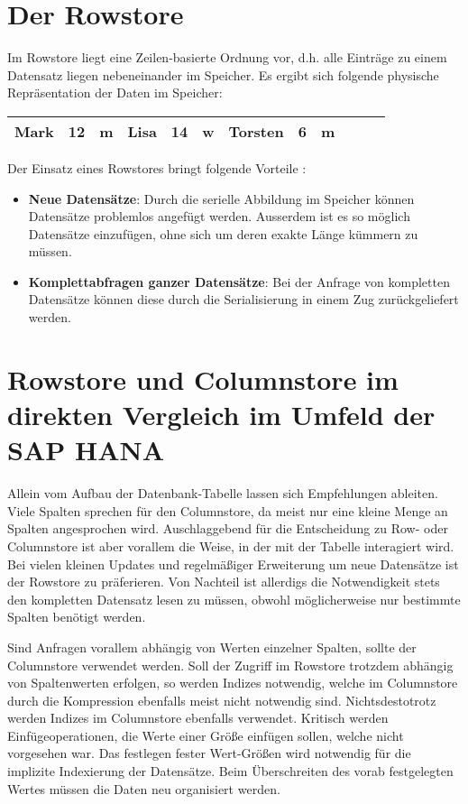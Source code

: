 \section{Der Rowstore}\label{row_col:rowstore}
Im Rowstore liegt eine Zeilen-basierte Ordnung vor, d.h. alle Einträge zu einem Datensatz liegen nebeneinander im Speicher. Es ergibt sich folgende physische Repräsentation der Daten im Speicher:

\begin{center}
    \begin{tabular}{ | l | l | l | l | l | l | l | l | l | l | l | l |}
    \hline
    Mark & 12 & m & Lisa & 14 & w & Torsten & 6 & m \\ \hline
    \end{tabular}
\end{center}

Der Einsatz eines Rowstores bringt folgende Vorteile \cite[vgl.][]{rowvscolumn, rowundcolumn}: 

\begin{itemize}
    \item \textbf{Neue Datensätze}: Durch die serielle Abbildung im Speicher können Datensätze problemlos angefügt werden. Ausserdem ist es so möglich Datensätze einzufügen, ohne sich um deren exakte Länge kümmern zu müssen.
    \item \textbf{Komplettabfragen ganzer Datensätze}: Bei der Anfrage von kompletten Datensätze können diese durch die Serialisierung in einem Zug zurückgeliefert werden. 
\end{itemize}

\section{Rowstore und Columnstore im direkten Vergleich im Umfeld der SAP HANA}

Allein vom Aufbau der Datenbank-Tabelle lassen sich Empfehlungen ableiten. Viele Spalten sprechen für den Columnstore, da meist nur eine kleine Menge an Spalten angesprochen wird. 
Auschlaggebend für die Entscheidung zu Row- oder Columnstore ist aber vorallem die Weise, in der mit der Tabelle interagiert wird. Bei vielen kleinen Updates und regelmäßiger Erweiterung um neue Datensätze ist der Rowstore zu präferieren. Von Nachteil ist allerdigs die Notwendigkeit stets den kompletten Datensatz lesen zu müssen, obwohl möglicherweise nur bestimmte Spalten benötigt werden. 

Sind Anfragen vorallem abhängig von Werten einzelner Spalten, sollte der Columnstore verwendet werden. Soll der Zugriff im Rowstore trotzdem abhängig von Spaltenwerten erfolgen, so werden Indizes notwendig, welche im Columnstore durch die Kompression ebenfalls meist nicht notwendig sind. Nichtsdestotrotz werden Indizes im Columnstore ebenfalls verwendet. Kritisch werden Einfügeoperationen, die Werte einer Größe einfügen sollen, welche nicht vorgesehen war. Das festlegen fester Wert-Größen wird notwendig für die implizite Indexierung der Datensätze. Beim Überschreiten des vorab festgelegten Wertes müssen die Daten neu organisiert werden. 


